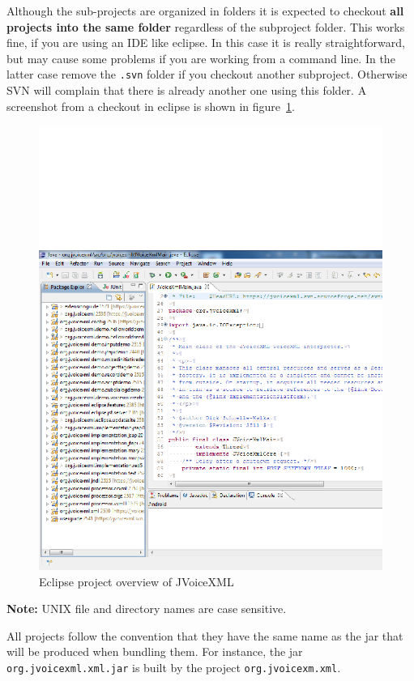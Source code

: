 \documentclass[11pt,a4paper]{article}
\begin{document}
Although the sub-projects are organized in folders it is expected to
checkout \textbf{all projects into the same folder}
regardless of the subproject folder.
This works fine, if you are using an IDE like eclipse. In this case it is really
straightforward, but may cause some problems if you are working from a command
line. In the latter case remove the \texttt{.svn} folder if you checkout
another subproject. Otherwise SVN will complain that there is already another
one using this folder.
A screenshot from a checkout in eclipse is shown in
figure~\ref{fig:eclipse-projects}.
\begin{figure}
\includegraphics[width=\linewidth]{eclipse-projects.png}
\caption{Eclipse project overview of JVoiceXML}
\label{fig:eclipse-projects}
\end{figure}

\textbf{Note:} UNIX file and directory names are case sensitive.

All projects follow the convention that they have the same name as the jar
that will be produced when bundling them. For instance, the jar \lstinline{org.jvoicexml.xml.jar}
is built by the project \lstinline{org.jvoicexm.xml}.
\end{document}
